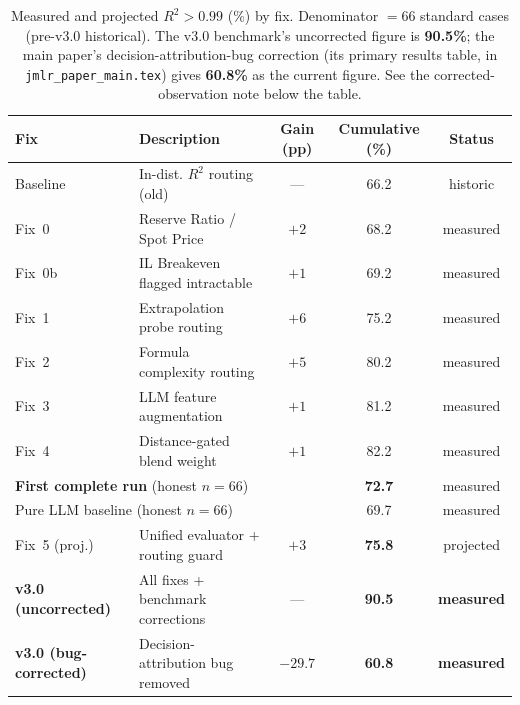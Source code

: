 \documentclass[twoside,11pt]{article}
\begin{document}
\begin{table}[h]
\centering
\caption{Measured and projected $R^2 > 0.99$ (\%) by fix.
         Denominator $= 66$ standard cases (pre-v3.0 historical). The
         v3.0 benchmark's uncorrected figure is \textbf{90.5\%}; the
         main paper's decision-attribution-bug correction
         (its primary results table, in \texttt{jmlr\_paper\_main.tex})
         gives \textbf{60.8\%} as the current figure. See the
         corrected-observation note below the table.}
\label{tab:projected}
\begin{tabular}{llccc}
\toprule
\textbf{Fix} & \textbf{Description} & \textbf{Gain (pp)} & \textbf{Cumulative (\%)} & \textbf{Status} \\
\midrule
Baseline    & In-dist. $R^2$ routing (old)      & ---  & 66.2 & historic  \\
Fix~0       & Reserve Ratio / Spot Price        & $+2$ & 68.2 & measured  \\
Fix~0b      & IL Breakeven flagged intractable  & $+1$ & 69.2 & measured  \\
Fix~1       & Extrapolation probe routing       & $+6$ & 75.2 & measured  \\
Fix~2       & Formula complexity routing        & $+5$ & 80.2 & measured  \\
Fix~3       & LLM feature augmentation          & $+1$ & 81.2 & measured  \\
Fix~4       & Distance-gated blend weight       & $+1$ & 82.2 & measured  \\
\midrule
\multicolumn{2}{l}{\textbf{First complete run} (honest $n{=}66$)} & & \textbf{72.7} & measured \\
\multicolumn{2}{l}{Pure LLM baseline (honest $n{=}66$)}           & & 69.7          & measured \\
\midrule
Fix~5 (proj.) & Unified evaluator + routing guard & $+3$ & \textbf{75.8} & projected \\
\midrule
\textbf{v3.0 (uncorrected)} & All fixes + benchmark corrections & --- & \textbf{90.5} & \textbf{measured} \\
\textbf{v3.0 (bug-corrected)} & Decision-attribution bug removed & $-29.7$ & \textbf{60.8} & \textbf{measured} \\
\bottomrule
\end{tabular}
\end{table}
\end{document}
